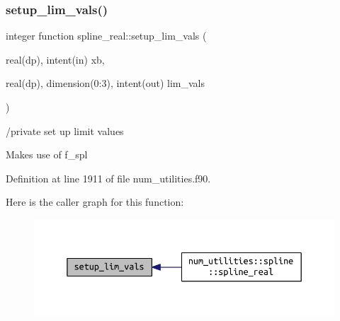 \subsubsection{\texorpdfstring{setup\+\_\+lim\+\_\+vals()}{setup\_lim\_vals()}}
{\footnotesize\ttfamily integer function spline\+\_\+real\+::setup\+\_\+lim\+\_\+vals (\begin{DoxyParamCaption}\item[{real(dp), intent(in)}]{xb,  }\item[{real(dp), dimension(0\+:3), intent(out)}]{lim\+\_\+vals }\end{DoxyParamCaption})}



/private set up limit values 

Makes use of f\+\_\+spl 

Definition at line 1911 of file num\+\_\+utilities.\+f90.

Here is the caller graph for this function\+:\nopagebreak
\begin{figure}[H]
\begin{center}
\leavevmode
\includegraphics[width=350pt]{num__utilities_8f90_a41f0ec23e08348e7498587997f483a00_icgraph}
\end{center}
\end{figure}
